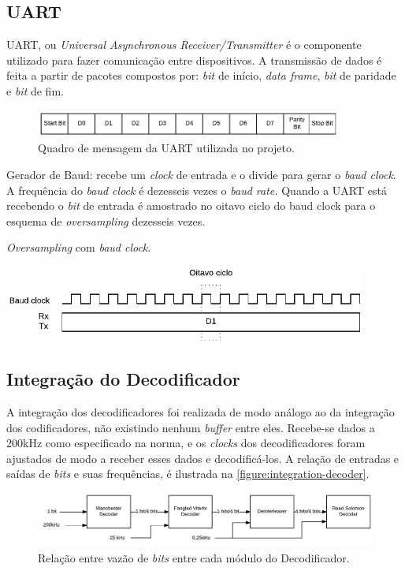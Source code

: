 	\subsection{UART}
	
	UART, ou \textit{Universal Asynchronous Receiver/Transmitter} é o componente utilizado para fazer comunicação entre dispositivos. A transmissão de dados é feita a partir de pacotes compostos por: \textit{bit} de início, \textit{data frame}, \textit{bit} de paridade e \textit{bit} de fim.
	\begin{figure}[h]
		\caption{\label{figure:uart-frame}Quadro de mensagem da UART utilizada no projeto.}
		\centering
		\includegraphics[width=0.9\textwidth]{uart/frame.pdf}
	\end{figure}
	
	Gerador de Baud: recebe um \textit{clock} de entrada e o divide para gerar o \textit{baud clock}. A frequência do \textit{baud clock} é dezesseis vezes o \textit{baud rate.} Quando a UART está recebendo o \textit{bit} de entrada é amostrado no oitavo ciclo do baud clock para o esquema de \textit{oversampling} dezesseis vezes.
	
	\begin{chart}[h]
		\caption{\label{figure:uart-txrx}\textit{Oversampling} com \textit{baud clock}.}
		\centering
		\includegraphics[width=0.9\textwidth]{uart/txrx.pdf}
	\end{chart}
	
	\subsection{Integração do Decodificador}\label{section:execution-integration-decoder-speeds}
	A integração dos decodificadores foi realizada de modo análogo ao da integração dos codificadores, não existindo nenhum \textit{buffer} entre eles. Recebe-se dados a 200kHz como especificado na norma, e os \textit{clocks} dos decodificadores foram ajustados de modo a receber esses dados e decodificá-los. A relação de entradas e saídas de \textit{bits} e suas frequências, é ilustrada na \autoref{figure:integration-decoder}.
	\begin{figure}[h]
		\caption{\label{figure:integration-decoder}Relação entre vazão de \textit{bits} entre cada módulo do Decodificador.}
		\centering
		\includegraphics[width=1\textwidth]{integration/speeds-decoder.pdf}
	\end{figure}

